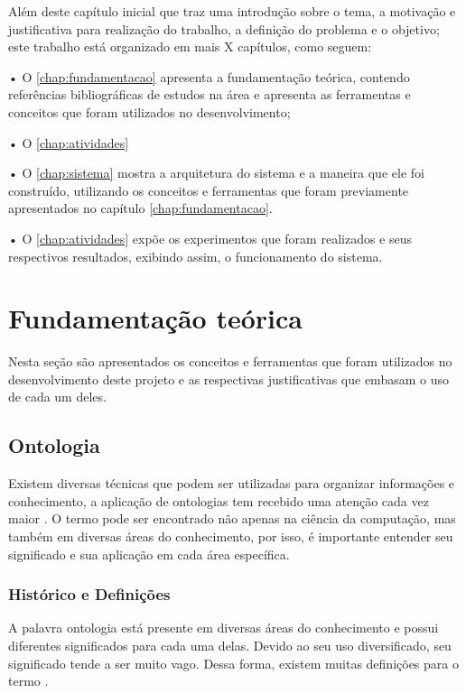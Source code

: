 \documentclass{bcc}
\begin{document}
Além deste capítulo inicial que traz uma introdução sobre o tema, a motivação e justificativa para realização do trabalho, a definição do problema e o objetivo; este trabalho está organizado em mais X capítulos, como seguem:

• O \autoref{chap:fundamentacao} apresenta a fundamentação teórica, contendo referências bibliográficas de estudos na área e apresenta as ferramentas e conceitos que foram utilizados no desenvolvimento;

• O \autoref{chap:atividades}

• O \autoref{chap:sistema} mostra a arquitetura do sistema e a maneira que ele foi construído, utilizando os conceitos e ferramentas que foram previamente apresentados no capítulo \autoref{chap:fundamentacao}.

• O \autoref{chap:atividades} expõe os experimentos que foram realizados e seus respectivos resultados, exibindo assim, o funcionamento do sistema.


\chapter{Fundamentação teórica}
\label{chap:fundamentacao}

Nesta seção são apresentados os conceitos e ferramentas que foram utilizados no desenvolvimento deste projeto e as respectivas justificativas que embasam o uso de cada um deles.

\section{Ontologia}

Existem diversas técnicas que podem ser utilizadas para organizar informações e conhecimento, a aplicação de ontologias tem recebido uma atenção cada vez maior \cite{almeida2014}. O termo pode ser encontrado não apenas na ciência da computação, mas também em diversas áreas do conhecimento, por isso, é importante entender seu significado e sua aplicação em cada área específica.

\subsection{Histórico e Definições}

A palavra ontologia está presente em diversas áreas do conhecimento e possui diferentes significados para cada uma delas. Devido ao seu
uso diversificado, seu significado tende a ser muito vago. Dessa forma, existem muitas definições para o termo \cite{gava2003}.
\end{document}
